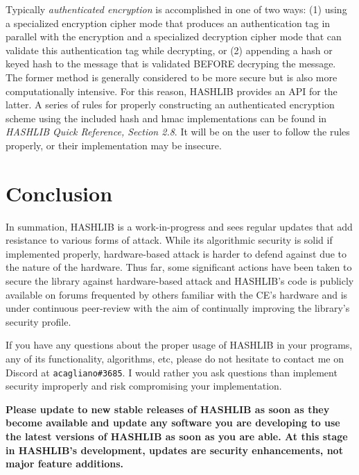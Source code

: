 \documentclass[titlepage]{article}
\begin{document}
			Typically \textit{authenticated encryption} is accomplished in one of two ways: (1) using a specialized encryption cipher mode that produces an authentication tag in parallel with the encryption and a specialized decryption cipher mode that can validate this authentication tag while decrypting, or (2) appending a hash or keyed hash to the message that is validated BEFORE decryping the message. The former method is generally considered to be more secure but is also more computationally intensive. For this reason, HASHLIB provides an API for the latter. A series of rules for properly constructing an authenticated encryption scheme using the included hash and hmac implementations can be found in \textit{HASHLIB Quick Reference, Section 2.8}. It will be on the user to follow the rules properly, or their implementation may be insecure.
	\newpage
	\section{Conclusion}
		In summation, HASHLIB is a work-in-progress and sees regular updates that add resistance to various forms of attack. While its algorithmic security is solid if implemented properly, hardware-based attack is harder to defend against due to the nature of the hardware. Thus far, some significant actions have been taken to secure the library against hardware-based attack and HASHLIB's code is publicly available on forums frequented by others familiar with the CE's hardware and is under continuous peer-review with the aim of continually improving the library's security profile.
		
		If you have any questions about the proper usage of HASHLIB in your programs, any of its functionality, algorithms, etc, please do not hesitate to contact me on Discord at \texttt{acagliano\#3685}. I would rather you ask questions than implement security improperly and risk compromising your implementation.
		
		{\color{red}\textbf{Please update to new stable releases of HASHLIB as soon as they become available and update any software you are developing to use the latest versions of HASHLIB as soon as you are able. At this stage in HASHLIB's development, updates are security enhancements, not major feature additions.}}
\end{document}
